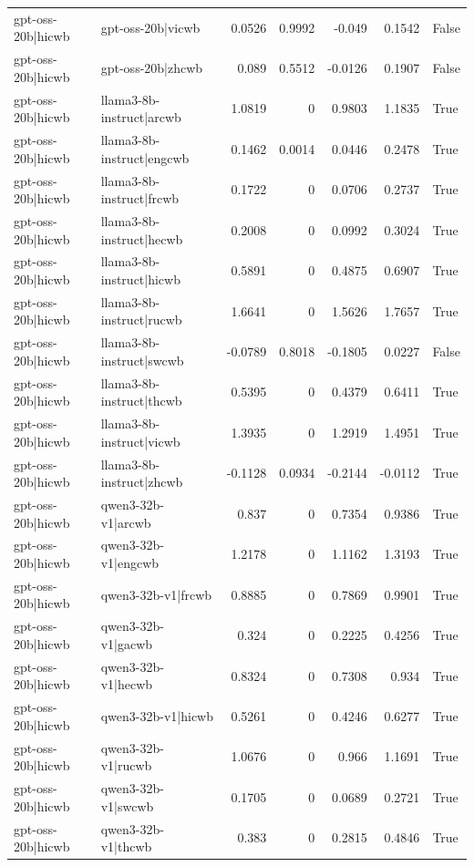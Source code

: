 \begin{table}
\begin{tabular}{l l r r r r l}
gpt-oss-20b|hicwb & gpt-oss-20b|vicwb & 0.0526 & 0.9992 & -0.049 & 0.1542 & False \\
gpt-oss-20b|hicwb & gpt-oss-20b|zhcwb & 0.089 & 0.5512 & -0.0126 & 0.1907 & False \\
gpt-oss-20b|hicwb & llama3-8b-instruct|arcwb & 1.0819 & 0 & 0.9803 & 1.1835 & True \\
gpt-oss-20b|hicwb & llama3-8b-instruct|engcwb & 0.1462 & 0.0014 & 0.0446 & 0.2478 & True \\
gpt-oss-20b|hicwb & llama3-8b-instruct|frcwb & 0.1722 & 0 & 0.0706 & 0.2737 & True \\
gpt-oss-20b|hicwb & llama3-8b-instruct|hecwb & 0.2008 & 0 & 0.0992 & 0.3024 & True \\
gpt-oss-20b|hicwb & llama3-8b-instruct|hicwb & 0.5891 & 0 & 0.4875 & 0.6907 & True \\
gpt-oss-20b|hicwb & llama3-8b-instruct|rucwb & 1.6641 & 0 & 1.5626 & 1.7657 & True \\
gpt-oss-20b|hicwb & llama3-8b-instruct|swcwb & -0.0789 & 0.8018 & -0.1805 & 0.0227 & False \\
gpt-oss-20b|hicwb & llama3-8b-instruct|thcwb & 0.5395 & 0 & 0.4379 & 0.6411 & True \\
gpt-oss-20b|hicwb & llama3-8b-instruct|vicwb & 1.3935 & 0 & 1.2919 & 1.4951 & True \\
gpt-oss-20b|hicwb & llama3-8b-instruct|zhcwb & -0.1128 & 0.0934 & -0.2144 & -0.0112 & True \\
gpt-oss-20b|hicwb & qwen3-32b-v1|arcwb & 0.837 & 0 & 0.7354 & 0.9386 & True \\
gpt-oss-20b|hicwb & qwen3-32b-v1|engcwb & 1.2178 & 0 & 1.1162 & 1.3193 & True \\
gpt-oss-20b|hicwb & qwen3-32b-v1|frcwb & 0.8885 & 0 & 0.7869 & 0.9901 & True \\
gpt-oss-20b|hicwb & qwen3-32b-v1|gacwb & 0.324 & 0 & 0.2225 & 0.4256 & True \\
gpt-oss-20b|hicwb & qwen3-32b-v1|hecwb & 0.8324 & 0 & 0.7308 & 0.934 & True \\
gpt-oss-20b|hicwb & qwen3-32b-v1|hicwb & 0.5261 & 0 & 0.4246 & 0.6277 & True \\
gpt-oss-20b|hicwb & qwen3-32b-v1|rucwb & 1.0676 & 0 & 0.966 & 1.1691 & True \\
gpt-oss-20b|hicwb & qwen3-32b-v1|swcwb & 0.1705 & 0 & 0.0689 & 0.2721 & True \\
gpt-oss-20b|hicwb & qwen3-32b-v1|thcwb & 0.383 & 0 & 0.2815 & 0.4846 & True \\

\end{tabular}
\end{table}
